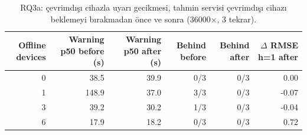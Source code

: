 \begin{table}[t]
\caption{RQ3a: çevrimdışı cihazla uyarı gecikmesi, tahmin servisi çevrimdışı cihazı beklemeyi bırakmadan önce ve sonra (36000$\times$, 3 tekrar).}
\label{tab:rq3a_offline_fix}
\centering\footnotesize
\begin{tabular}{rrrrrr}
\toprule
Offline devices & Warning p50 before (s) & Warning p50 after (s) & Behind before & Behind after & $\Delta$ RMSE h=1 after \\
\midrule
0 & 38.5 & 39.9 & 0/3 & 0/3 & 0.00 \\
1 & 148.9 & 37.0 & 3/3 & 0/3 & -0.07 \\
3 & 39.2 & 30.2 & 1/3 & 0/3 & -0.04 \\
6 & 17.9 & 18.2 & 0/3 & 0/3 & 0.72 \\
\bottomrule
\end{tabular}
\end{table}
